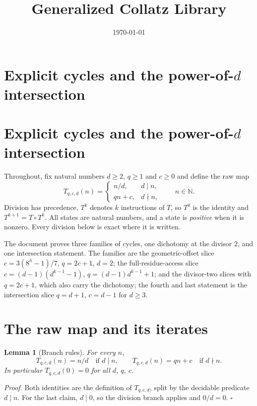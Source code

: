 \documentclass[11pt,letterpaper]{article}
\title{Generalized Collatz Library}
\author{}
\date{\today}
\newcommand{\N}{\mathbb{N}}
\newtheorem{lemma}[theorem]{Lemma}
\newenvironment{proof}{\noindent\textit{Proof.}}{\hfill\(\square\)}
\begin{document}
\maketitle
\section*{Explicit cycles and the power-of-\(d\) intersection}

\section*{Explicit cycles and the power-of-\(d\) intersection}

Throughout, fix natural numbers \(d\ge2\), \(q\ge1\) and \(c\ge0\) and define
the raw map
\[
 T_{q,c,d}(n)=\begin{cases} n/d, & d\mid n,\\ qn+c, & d\nmid n,\end{cases}
 \qquad n\in\N .
\]
Division has precedence, \(T^{k}\) denotes \(k\) instructions of \(T\), so
\(T^{0}\) is the identity and \(T^{k+1}=T\circ T^{k}\). All states are natural
numbers, and a state is \emph{positive} when it is nonzero. Every division
below is exact where it is written.

The document proves three families of cycles, one dichotomy at the divisor
\(2\), and one intersection statement. The families are the geometric-offset
slice \(c=3(8^{h}-1)/7\), \(q=2c+1\), \(d=2\); the full-residue-access slice
\(c=(d-1)(d^{k-1}-1)\), \(q=(d-1)d^{k-1}+1\); and the divisor-two slices with
\(q=2c+1\), which also carry the dichotomy; the fourth and last statement is
the intersection slice \(q=d+1\), \(c=d-1\) for \(d\ge3\).

\section{The raw map and its iterates}

\begin{lemma}[Branch rules]\label{Lem:Branch}
For every \(n\),
\[
 T_{q,c,d}(n)=n/d \quad\text{if } d\mid n,
 \qquad
 T_{q,c,d}(n)=qn+c \quad\text{if } d\nmid n .
\]
In particular \(T_{q,c,d}(0)=0\) for all \(d\), \(q\), \(c\).
\end{lemma}

\begin{proof}
Both identities are the definition of \(T_{q,c,d}\), split by the decidable
predicate \(d\mid n\). For the last claim, \(d\mid0\), so the division branch
applies and \(0/d=0\).
\end{proof}
\end{document}

